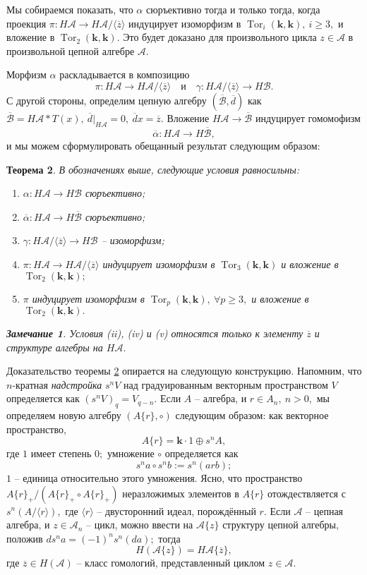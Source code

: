 \documentclass[10pt,a4paper]{article}
\DeclareMathOperator{\Tor}{Tor}
\def\A{\mathscr{A}}
\def\B{\mathscr{B}}
\def\k{\mathbf{k}}
\newtheorem{thm}{Теорема}[section]
\theoremstyle{definition}
\newtheorem{rmk}[thm]{Замечание}
\begin{document}
Мы собираемся показать, что $\alpha$ сюръективно тогда и только тогда, когда проекция $\pi:H\A\to H\A/\langle \overline{z}\rangle$ индуцирует изоморфизм в $\Tor_i(\k,\k),~i\geq 3,$ и вложение в $\Tor_2(\k,\k).$ Это будет доказано для произвольного цикла $z\in\A$ в произвольной цепной алгебре $\A.$

Морфизм $\alpha$ раскладывается в композицию
$$\pi:H\A\to H\A/\langle \overline{z}\rangle\quad\text{и}\quad\gamma:H\A/\langle\overline{z}\rangle\to H\B.$$
С другой стороны, определим цепную алгебру $(\overline{\B},\overline{d})$ как $\overline{\B}=H\A\ast T(x),~\overline{d}|_{H\A}=0,~\overline{d}x=\overline{z}.$ Вложение $H\A\to\overline{\B}$ индуцирует гомомофизм $$\overline{\alpha}:H\A\to H\overline{\B},$$ и мы можем сформулировать обещанный результат следующим образом:
\begin{thm}\label{thm_1.1}
В обозначениях выше, следующие условия равносильны:
\begin{enumerate}
\item[(i)] $\alpha:H\A\to H\B$ сюръективно;
\item[(ii)] $\overline{\alpha}:H\A\to H\overline{\B}$ сюръективно;
\item[(iii)] $\gamma:H\A/\langle\overline{z}\rangle \to H\B$ -- изоморфизм;
\item[(iv)] $\pi:H\A\to H\A/\langle\overline{z}\rangle$ индуцирует изоморфизм в $\Tor_3(\k,\k)$ и вложение в $\Tor_2(\k,\k);$
\item[(v)] $\pi$ индуцирует изоморфизм в $\Tor_p(\k,\k),~\forall p\ge 3,$ и вложение в $\Tor_2(\k,\k).$
\end{enumerate}
\begin{rmk}\label{rmk_1.2}
Условия (ii), (iv) и (v) относятся только к элементу $\overline{z}$ и структуре алгебры на $H\A.$
\end{rmk}
\end{thm}

Доказательство теоремы \ref{thm_1.1} опирается на следующую конструкцию. Напомним, что $n$-кратная \emph{надстройка} $s^nV$ над градуированным векторным пространством $V$ определяется как $(s^nV)_q=V_{q-n}.$ Если $A$ -- алгебра, и $r\in A_n,~n>0,$ мы определяем новую алгебру $(A\{r\},\circ)$ следующим образом: как векторное пространство,
$$A\{r\}=\k\cdot 1\oplus s^n A,$$ где $1$ имеет степень $0;$ умножение $\circ$ определяется как $$s^na\circ s^nb := s^n(arb);$$ $1$ -- единица относительно этого умножения. Ясно, что пространство $ A\{r\}_+/ (A\{r\}_+\circ A\{r\}_+)$ неразложимых элементов в $A\{r\}$ отождествляется с $s^n(A/\langle r\rangle),$ где $\langle r\rangle$ -- двусторонний идеал, порождённый $r.$ Если $\A$ -- цепная алгебра, и $z\in \A_n$ -- цикл, можно ввести на $\A\{z\}$ структуру цепной алгебры, положив $ds^n a=(-1)^n s^n(da);$ тогда
$$H(\A\{z\})=H\A\{\overline{z}\},$$ где $\overline{z}\in H(\A)$ -- класс гомологий, представленный циклом $z\in\A.$
\end{document}
